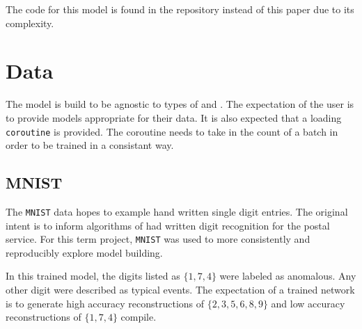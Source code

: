 \documentclass{article}
\begin{document}
\begin{multicols}{2}
The code for this model is found in the repository instead of this paper due
to its complexity.


\section{Data}

The model is build to be agnostic to types of \encoder and \decoder. The expectation of the
user is to provide models appropriate for their data. It is also expected that a loading
\texttt{coroutine} is provided. The coroutine needs to take in the count of a batch in order
to be trained in a consistant way.

\subsection{MNIST}
\def\mnist{\texttt{MNIST}\xspace}

The \mnist data hopes to example hand written single digit entries. The
original intent is to inform algorithms of had written digit recognition for the postal
service. For this term project, \mnist was used to more consistently and reproducibly
explore model building.



In this trained model, the digits listed as $\{1, 7, 4\}$ were labeled as anomalous. Any other
digit were described as typical events. The expectation of a trained network is to
generate high accuracy reconstructions of $\{2,3,5,6,8,9\}$ and low accuracy reconstructions of
$\{1, 7, 4\}$ compile.


\end{multicols}
\end{document}
